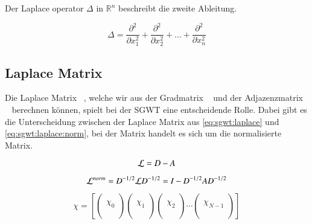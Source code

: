 \begin{refsection}
Der Laplace operator $\Delta$ in $\mathbb{R}^n$ beschreibt die zweite Ableitung.

\begin{equation}
\Delta = \frac{\partial^2}{\partial x_1^2}
+ \frac{\partial^2}{\partial x_2^2}
+ \dots
+ \frac{\partial^2}{\partial x_n^2}
\end{equation}

\subsection{Laplace Matrix\label{subsec:sgwt:laplacm}}

Die Laplace Matrix 
\laplaceL~\cite{noauthor_laplace-matrix_2017}, welche wir aus der 
Gradmatrix \degreeM~\cite{noauthor_degree_2018} und der Adjazenzmatrix 
\adjacencyM~\cite{noauthor_adjacency_2019} berechnen k\"onnen, spielt bei der 
SGWT eine entscheidende Rolle. Dabei gibt es 
die Unterscheidung zwischen der Laplace Matrix aus \cref{eq:sgwt:laplace} und 
\cref{eq:sgwt:laplace:norm}, bei der \laplaceLnorm{} Matrix handelt es sich um 
die normalisierte \laplaceL{} Matrix.

\begin{equation}
\laplaceL = \degreeM - \adjacencyM
\label{eq:sgwt:laplace}
\end{equation}

\begin{equation}
\laplaceLnorm
= \degreeM^{-1/2}\laplaceL\degreeM^{-1/2}
= I - \degreeM^{-1/2}\adjacencyM\degreeM^{-1/2}
\label{eq:sgwt:laplace:norm}
\end{equation}

\begin{equation}
\chi = 
\left[
\begin{pmatrix}\\\chi_0\\\\\end{pmatrix}
\begin{pmatrix}\\\chi_1\\\\\end{pmatrix}
\begin{pmatrix}\\\chi_2\\\\\end{pmatrix}
\cdots
\begin{pmatrix}\\\chi_{N-1}\\\\\end{pmatrix}
\right]
\end{equation}


\end{refsection}
